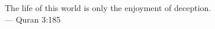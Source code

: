 \thispagestyle{empty}

\vspace*{3cm}


\begin{center}
The life of this world is only the enjoyment of deception.\\
\smallskip{}
--- Quran 3:185 
\par\end{center}
